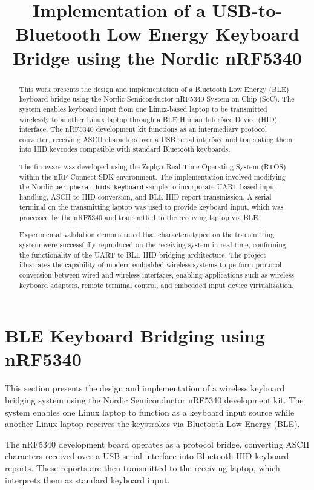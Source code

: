 \documentclass[conference]{IEEEtran}
\title{Implementation of a USB-to-Bluetooth Low Energy Keyboard Bridge using the Nordic nRF5340}
\author{
\IEEEauthorblockN{Bhargav K, Harsha B J}
\IEEEauthorblockA{
Department of Electrical Engineering\\
IIT Hyderabad\\
Email: ee25btech11013@iith.ac.in, ee25btech11026@iith.ac.in}
}
\begin{document}
\maketitle
\begin{abstract}

This work presents the design and implementation of a Bluetooth Low Energy (BLE) keyboard bridge using the Nordic Semiconductor nRF5340 System-on-Chip (SoC). The system enables keyboard input from one Linux-based laptop to be transmitted wirelessly to another Linux laptop through a BLE Human Interface Device (HID) interface. The nRF5340 development kit functions as an intermediary protocol converter, receiving ASCII characters over a USB serial interface and translating them into HID keycodes compatible with standard Bluetooth keyboards.

The firmware was developed using the Zephyr Real-Time Operating System (RTOS) within the nRF Connect SDK environment. The implementation involved modifying the Nordic \texttt{peripheral\_hids\_keyboard} sample to incorporate UART-based input handling, ASCII-to-HID conversion, and BLE HID report transmission. A serial terminal on the transmitting laptop was used to provide keyboard input, which was processed by the nRF5340 and transmitted to the receiving laptop via BLE.

Experimental validation demonstrated that characters typed on the transmitting system were successfully reproduced on the receiving system in real time, confirming the functionality of the UART-to-BLE HID bridging architecture. The project illustrates the capability of modern embedded wireless systems to perform protocol conversion between wired and wireless interfaces, enabling applications such as wireless keyboard adapters, remote terminal control, and embedded input device virtualization.

\end{abstract}
\section{BLE Keyboard Bridging using nRF5340}

This section presents the design and implementation of a wireless keyboard bridging system using the Nordic Semiconductor nRF5340 development kit. The system enables one Linux laptop to function as a keyboard input source while another Linux laptop receives the keystrokes via Bluetooth Low Energy (BLE).

The nRF5340 development board operates as a protocol bridge, converting ASCII characters received over a USB serial interface into Bluetooth HID keyboard reports. These reports are then transmitted to the receiving laptop, which interprets them as standard keyboard input.
\end{document}
